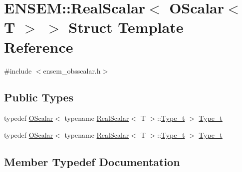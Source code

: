 \hypertarget{structENSEM_1_1RealScalar_3_01OScalar_3_01T_01_4_01_4}{}\section{E\+N\+S\+EM\+:\+:Real\+Scalar$<$ O\+Scalar$<$ T $>$ $>$ Struct Template Reference}
\label{structENSEM_1_1RealScalar_3_01OScalar_3_01T_01_4_01_4}


{\ttfamily \#include $<$ensem\+\_\+obsscalar.\+h$>$}

\subsection*{Public Types}
\begin{DoxyCompactItemize}
\item 
typedef \mbox{\hyperlink{classENSEM_1_1OScalar}{O\+Scalar}}$<$ typename \mbox{\hyperlink{structENSEM_1_1RealScalar}{Real\+Scalar}}$<$ T $>$\+::\mbox{\hyperlink{structENSEM_1_1RealScalar_3_01OScalar_3_01T_01_4_01_4_a6c39297bc962beb39d2b33a9cdf329dd}{Type\+\_\+t}} $>$ \mbox{\hyperlink{structENSEM_1_1RealScalar_3_01OScalar_3_01T_01_4_01_4_a6c39297bc962beb39d2b33a9cdf329dd}{Type\+\_\+t}}
\item 
typedef \mbox{\hyperlink{classENSEM_1_1OScalar}{O\+Scalar}}$<$ typename \mbox{\hyperlink{structENSEM_1_1RealScalar}{Real\+Scalar}}$<$ T $>$\+::\mbox{\hyperlink{structENSEM_1_1RealScalar_3_01OScalar_3_01T_01_4_01_4_a6c39297bc962beb39d2b33a9cdf329dd}{Type\+\_\+t}} $>$ \mbox{\hyperlink{structENSEM_1_1RealScalar_3_01OScalar_3_01T_01_4_01_4_a6c39297bc962beb39d2b33a9cdf329dd}{Type\+\_\+t}}
\end{DoxyCompactItemize}


\subsection{Member Typedef Documentation}
\mbox{\label{structENSEM_1_1RealScalar_3_01OScalar_3_01T_01_4_01_4_a6c39297bc962beb39d2b33a9cdf329dd}} 
